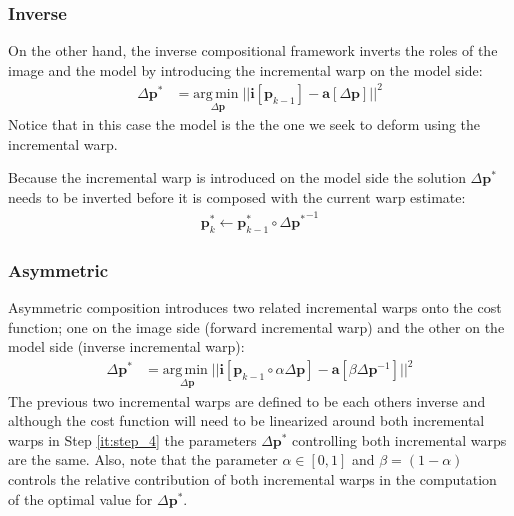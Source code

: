 \subsubsection{Inverse}
\label{sec:inverse}

On the other hand, the inverse compositional framework inverts the roles of the image and the model by introducing the incremental warp on the model side:
\begin{equation}
    \begin{aligned}
        \Delta \mathbf{p}^* & = \underset{\Delta \mathbf{p}} {\mathrm{arg\, min\;}} || \mathbf{i}[\mathbf{p}_{k-1}] - \mathbf{a} [\Delta \mathbf{p}] ||^2
    \label{eq:ssd_ic}
    \end{aligned}
\end{equation}
Notice that in this case the model is the the one we seek to deform using the incremental warp.

Because the incremental warp is introduced on the model side the solution $\Delta \mathbf{p}^*$ needs to be inverted before it is composed with the current warp estimate:
\begin{equation}
 	\begin{aligned}
    	\mathbf{p}_k^* \leftarrow \mathbf{p}_{k-1}^* \circ \Delta {\mathbf{p}^*}^{-1} 
    \label{eq:ic_update}
    \end{aligned}
\end{equation}

\subsubsection{Asymmetric}
\label{sec:asymmetric}

Asymmetric composition introduces two related incremental warps onto the cost function; one on the image side (forward incremental warp) and the other on the model side (inverse incremental warp): 
\begin{equation}
    \begin{aligned}
        \Delta \mathbf{p}^* & = \underset{\Delta \mathbf{p}} {\mathrm{arg\, min\;}} || \mathbf{i}[\mathbf{p}_{k-1} \circ \alpha \Delta \mathbf{p}] - \mathbf{a} [\beta \Delta \mathbf{p}^{-1}] ||^2
    \label{eq:ssd_ac}
    \end{aligned}
\end{equation}
The previous two incremental warps are defined to be each others inverse and although the cost function will need to be linearized around both incremental warps in Step \ref{it:step_4} the parameters $\Delta \mathbf{p}^* $ controlling both incremental warps are the same. Also, note that the parameter $\alpha \in [0, 1]$ and $\beta=(1-\alpha)$ controls the relative contribution of both incremental warps in the computation of the optimal value for $\Delta \mathbf{p}^*$. 

